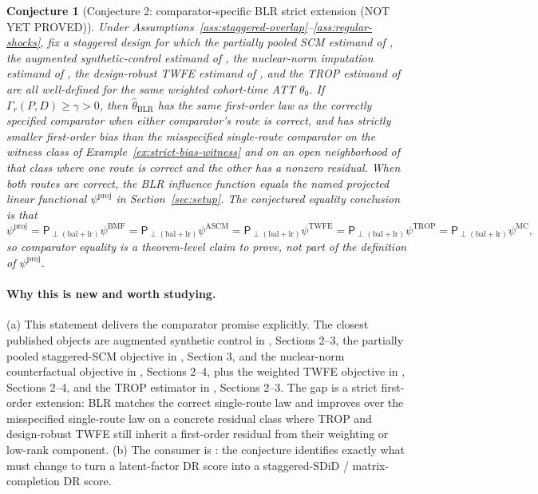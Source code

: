 \documentclass[11pt]{article}
\theoremstyle{definition}
\theoremstyle{plain}
\newtheorem{conjecture}{Conjecture}
\theoremstyle{remark}
\begin{document}
\begin{conjecture}[Conjecture 2: comparator-specific BLR strict extension (NOT YET PROVED)]\label{conj:comparator-extension}
Under Assumptions~\ref{ass:staggered-overlap}--\ref{ass:regular-shocks}, fix a
staggered design for which the partially pooled SCM estimand of
\citet{BenMichaelFellerRothstein2022}, the augmented synthetic-control estimand
of \citet{BenMichaelFellerRothstein2021}, the nuclear-norm imputation estimand
of \citet{AtheyBayatiDoudchenkoImbensKhosravi2021}, the design-robust TWFE
estimand of \citet{ArkhangelskyImbensLeiLuo2024}, and the TROP estimand of
\citet{AtheyImbensQuViviano2025} are all well-defined for the same weighted
cohort-time ATT $\theta_0$. If $\Gamma_r(P,D)\ge\gamma>0$,
then $\widehat\theta_{\mathrm{BLR}}$ has the same first-order law as the
correctly specified comparator when either comparator's route is correct, and
has strictly smaller first-order bias than the misspecified single-route
comparator on the witness class of Example~\ref{ex:strict-bias-witness} and on
an open neighborhood of that class where one route is correct and the other has
a nonzero residual. When both routes are correct, the BLR influence function
equals the named projected linear functional $\psi^{\mathrm{proj}}$ in
Section~\ref{sec:setup}. The conjectured equality conclusion is that
\[
  \psi^{\mathrm{proj}}
  =\mathsf P_{\perp(\mathrm{bal}+\mathrm{lr})}\psi^{\mathrm{BMF}}
  =\mathsf P_{\perp(\mathrm{bal}+\mathrm{lr})}\psi^{\mathrm{ASCM}}
  =\mathsf P_{\perp(\mathrm{bal}+\mathrm{lr})}\psi^{\mathrm{TWFE}}
  =\mathsf P_{\perp(\mathrm{bal}+\mathrm{lr})}\psi^{\mathrm{TROP}}
  =\mathsf P_{\perp(\mathrm{bal}+\mathrm{lr})}\psi^{\mathrm{MC}},
\]
so comparator equality is a theorem-level claim to prove, not part of the
definition of $\psi^{\mathrm{proj}}$.
\end{conjecture}
\paragraph{Why this is new and worth studying.}
(a) This statement delivers the comparator promise explicitly. The closest
published objects are augmented synthetic control in
\citet{BenMichaelFellerRothstein2021}, Sections 2--3, the partially pooled
staggered-SCM objective in \citet{BenMichaelFellerRothstein2022}, Section 3,
and the nuclear-norm counterfactual objective in \citet{AtheyBayatiDoudchenkoImbensKhosravi2021},
Sections 2--4, plus the weighted TWFE objective in
\citet{ArkhangelskyImbensLeiLuo2024}, Sections 2--4, and the TROP estimator in
\citet{AtheyImbensQuViviano2025}, Sections 2--3. The gap is a strict
first-order extension: BLR matches the correct single-route law and improves
over the misspecified single-route law on a concrete residual class where TROP
and design-robust TWFE still inherit a first-order residual from their
weighting or low-rank component. (b) The consumer is
\citet{AbadieAgarwalDwivediShah2024}: the conjecture identifies exactly what
must change to turn a latent-factor DR score into a staggered-SDiD /
matrix-completion DR score.
\end{document}
